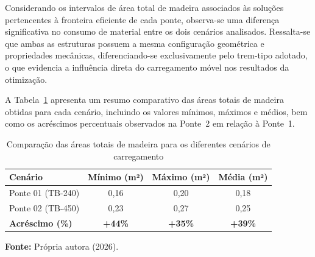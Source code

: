 
Considerando os intervalos de área total de madeira associados às soluções pertencentes à fronteira eficiente de cada ponte, observa-se uma diferença significativa no consumo de material entre os dois cenários analisados. Ressalta-se que ambas as estruturas possuem a mesma configuração geométrica e propriedades mecânicas, diferenciando-se exclusivamente pelo trem-tipo adotado, o que evidencia a influência direta do carregamento móvel nos resultados da otimização.

A Tabela~\ref{tab:comparacao_areas} apresenta um resumo comparativo das áreas totais de madeira obtidas para cada cenário, incluindo os valores mínimos, máximos e médios, bem como os acréscimos percentuais observados na Ponte~2 em relação à Ponte~1.

\begin{table}[htpb!]
    \centering
    \caption{Comparação das áreas totais de madeira para os diferentes cenários de carregamento}
    \label{tab:comparacao_areas}

    \fontsize{11pt}{13.2pt}\selectfont
    \begin{tabular}{lccc}
        \toprule
        \textbf{Cenário} & \textbf{Mínimo (m²)} & \textbf{Máximo (m²)} & \textbf{Média (m²)} \\ 
        \midrule
        Ponte 01 (TB-240) & 0,16 & 0,20 & 0,18 \\
        Ponte 02 (TB-450) & 0,23 & 0,27 & 0,25 \\
        \midrule
        \textbf{Acréscimo (\%)} & \textbf{+44\%} & \textbf{+35\%} & \textbf{+39\%} \\
        \bottomrule
    \end{tabular}

    \vspace{0.1cm}
    \par {\fontsize{11pt}{13.2pt}\selectfont \textbf{Fonte:} Própria autora (2026).}

\end{table}

